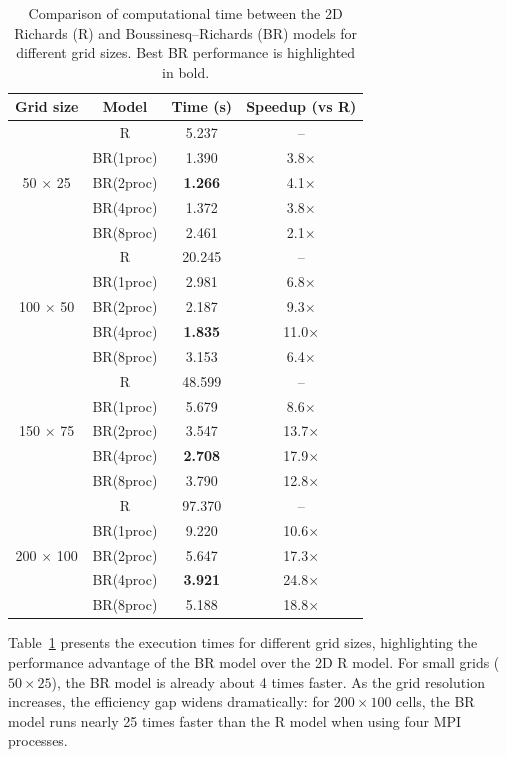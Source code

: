 \documentclass[12pt,a4paper]{article}
\begin{document}
\begin{table}[H]
\centering
\caption{Comparison of computational time between the 2D Richards (R) and Boussinesq–Richards (BR) models for different grid sizes. Best BR performance is highlighted in bold.}
\label{tab:runtime}
\begin{tabular}{c|c|c|c}
\hline
Grid size & Model & Time (s) & Speedup (vs R) \\
\hline
\multirow{5}{*}{50 $\times$ 25} 
& R         & 5.237  & -- \\
& BR(1proc) & 1.390 & 3.8$\times$ \\
& BR(2proc) & \textbf{1.266} & 4.1$\times$ \\
& BR(4proc) & 1.372 & 3.8$\times$ \\
& BR(8proc) & 2.461 & 2.1$\times$ \\
\hline
\multirow{5}{*}{100 $\times$ 50} 
& R         & 20.245  & -- \\
& BR(1proc) & 2.981 & 6.8$\times$ \\
& BR(2proc) & 2.187 & 9.3$\times$ \\
& BR(4proc) & \textbf{1.835} & 11.0$\times$ \\
& BR(8proc) & 3.153 & 6.4$\times$ \\
\hline
\multirow{5}{*}{150 $\times$ 75} 
& R         & 48.599  & -- \\
& BR(1proc) & 5.679 & 8.6$\times$ \\
& BR(2proc) & 3.547 & 13.7$\times$ \\
& BR(4proc) & \textbf{2.708} & 17.9$\times$ \\
& BR(8proc) & 3.790 & 12.8$\times$ \\
\hline
\multirow{5}{*}{200 $\times$ 100} 
& R         & 97.370  & -- \\
& BR(1proc) & 9.220 & 10.6$\times$ \\
& BR(2proc) & 5.647 & 17.3$\times$ \\
& BR(4proc) & \textbf{3.921} & 24.8$\times$ \\
& BR(8proc) & 5.188 & 18.8$\times$ \\
\hline
\end{tabular}
\end{table}
 
Table~\ref{tab:runtime} presents the execution times for different grid sizes, highlighting the performance advantage of the BR model over the 2D R model.  
For small grids ($50 \times 25$), the BR model is already about 4 times faster. As the grid resolution increases, the efficiency gap widens dramatically: for $200 \times 100$ cells, the BR model runs nearly 25 times faster than the R model when using four MPI processes.\\
\end{document}
